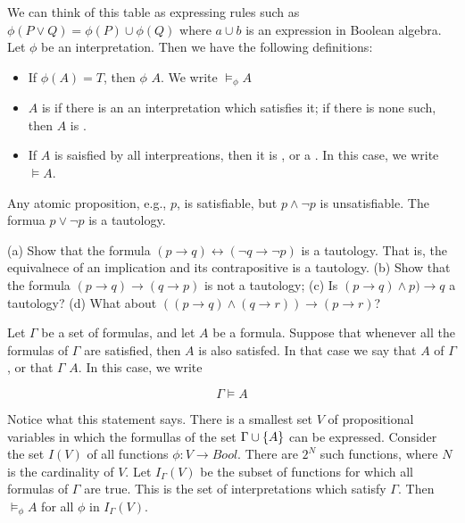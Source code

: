 We can think of this table as expressing rules such as $\phi(P \lor Q) = \phi(P) \cup \phi(Q)$ where $a \cup b$  is an expression in  Boolean algebra. Let $\phi$ be an interpretation. Then we have the following definitions:

\begin{itemize}

\item If $\phi(A) =T$, then  $\phi$  $A$.  We write $\models_\phi A$

\item $A$ is  if there is an an interpretation which satisfies it; if there is none such, then $A$ is .

\item If $A$ is saisfied by all interpreations, then it is , or a .  In this case, we write $\models A$.

\end{itemize} 

Any atomic  proposition, e.g., $p$, is satisfiable, but  $p \land \neg p$ is unsatisfiable.  The formua  $p  \lor \neg p$ is a tautology.

\begin{exercise}
(a) Show that the formula $(p \to q) \leftrightarrow (\neg q \to \neg p)$ is a tautology.  That is, the equivalnece of an implication and its contrapositive is a tautology. (b) Show that the formula $(p \to q) \to (q \to  p)$ is not a tautology;
(c) Is $(p \to q) \land p) \to q$ a tautology? (d) What about $((p \to q) \land (q \to r)) \to (p \to r)$?
\end{exercise}


Let $\Gamma$ be a set of formulas, and let $A$ be a formula.  Suppose that whenever all the formulas of $\Gamma$ are satisfied,  then $A$  is also satisfed. In that case we say that $A$  of $\Gamma$, or that $\Gamma$  $A$.  In this case, we write

$$
\Gamma \models A
$$

Notice what this statement says.  There is a smallest set $V$ of propositional variables in which the formullas of the set $\Gamma \cup \{ A \}$ can be expressed.  Consider the set $I(V)$ of all functions $\phi: V \to Bool$.  There are $2^N$ such functions, where $N$ is the cardinality of $V$.  Let $I_\Gamma(V)$ be the subset of functions for which all formulas of $\Gamma$ are true.  This is the set of interpretations which satisfy $\Gamma$. Then $\models_\phi A$ for all $\phi$ in $I_\Gamma(V)$.


